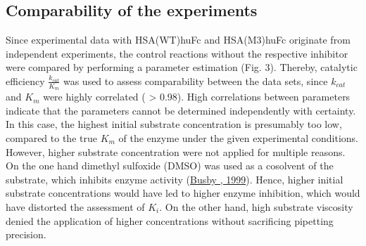 \documentclass[letterpaper,12pt,english]{jupyterBook}
\begin{document}
\subsection{Comparability of the experiments}
\label{\detokenize{scenarios/chymotrypsin_inhibition:comparability-of-the-experiments}}
\sphinxAtStartPar
Since experimental data with HSA(WT)\sphinxhyphen{}huFc and HSA(M3)\sphinxhyphen{}huFc originate from independent experiments, the control reactions without the respective inhibitor were compared by performing a parameter estimation (Fig. 3). Thereby, catalytic efficiency \(\frac{k_{cat}}{K_{m}}\) was used to assess comparability between the data sets, since \(k_{cat}\) and \(K_{m}\) were highly correlated ( > 0.98). High correlations between parameters indicate that the parameters cannot be determined independently with certainty. In this case, the highest initial substrate concentration is presumably too low, compared to the true \(K_{m}\) of the enzyme under the given experimental conditions. However, higher substrate concentration were not applied for multiple reasons. On the one hand dimethyl sulfoxide (DMSO) was used as a co\sphinxhyphen{}solvent of the substrate, which inhibits enzyme activity (\hyperlink{cite.references:id9}{Busby , 1999}). Hence, higher initial substrate concentrations would have led to higher enzyme inhibition, which would have distorted the assessment of \(K_{i}\).
On the other hand, high substrate viscosity denied the application of higher concentrations without sacrificing pipetting precision.
\end{document}
